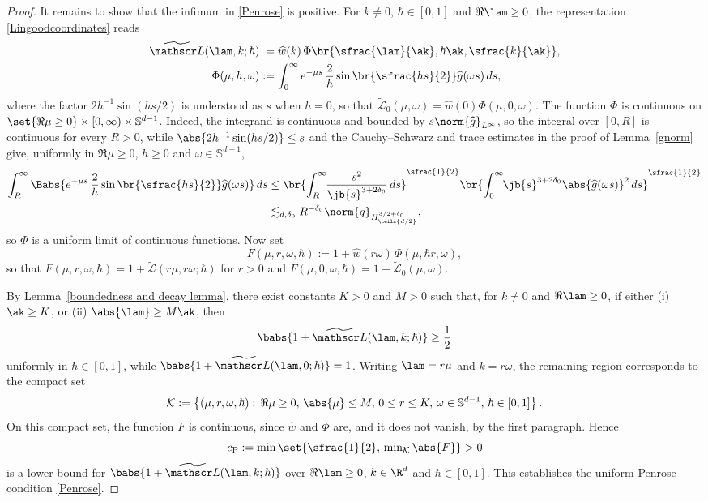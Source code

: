\begin{proof}
It remains to show that the infimum in \eqref{Penrose} is positive. For $k\neq0$, $\hbar\in[0,1]$ and $\Re\lam\geq0$, the representation \eqref{Lingoodcoordinates} reads\vspace*{-3pt}
\begin{align*}
\widetilde{\mathscr L}(\lam,k;\hbar)&\hphantom{:}=\widehat w(k)\,\Phi\br{\sfrac{\lam}{\ak},\hbar\ak,\sfrac{k}{\ak}},\\
\Phi(\mu,h,\omega)&:=\int_0^\infty e^{-\mu s}\,\frac{2}{h}\sin\br{\sfrac{hs}{2}}\widehat g(\omega s)\,ds,
\end{align*}
where the factor $2h^{-1}\sin(hs/2)$ is understood as $s$ when $h=0$, so that $\widetilde{\mathscr L}_0(\mu,\omega)=\widehat w(0)\Phi(\mu,0,\omega)$. The function $\Phi$ is continuous on $\set{\Re\mu\geq0}\times[0,\infty)\times\mathbb S^{d-1}$. Indeed, the integrand is continuous and bounded by $s\norm{\widehat g}_{L^\infty}$, so the integral over $[0,R]$ is continuous for every $R>0$, while $\abs{2h^{-1}\sin(hs/2)}\leq s$ and the Cauchy--Schwarz and trace estimates in the proof of Lemma~\ref{gnorm} give, uniformly in $\Re\mu\geq0$, $h\geq0$ and $\omega\in\mathbb S^{d-1}$,\vspace*{-3pt}
\begin{align*}
\int_R^\infty\Babs{e^{-\mu s}\,\frac{2}{h}\sin\br{\sfrac{hs}{2}}\widehat g(\omega s)}\,ds
&\leq\br{\int_R^\infty\hspace*{-1mm}\frac{s^2}{\jb{s}^{3+2\delta_0}}\,ds}^{\sfrac{1}{2}}\br{\int_0^\infty\hspace*{-1mm}\jb{s}^{3+2\delta_0}\abs{\widehat g(\omega s)}^2\,ds}^{\sfrac{1}{2}}\\
&\lesssim_{d,\delta_0} R^{-\delta_0}\norm{g}_{H^{3/2+\delta_0}_{\ceils{d/2}}},
\end{align*}
so $\Phi$ is a uniform limit of continuous functions. Now set\vspace*{-3pt}
\[
F(\mu,r,\omega,\hbar):=1+\widehat w(r\omega)\,\Phi(\mu,\hbar r,\omega),
\]
so that $F(\mu,r,\omega,\hbar)=1+\widetilde{\mathscr L}(r\mu,r\omega;\hbar)$ for $r>0$ and $F(\mu,0,\omega,\hbar)=1+\widetilde{\mathscr L}_0(\mu,\omega)$.

By Lemma~\ref{boundedness and decay lemma}, there exist constants \( K > 0 \) and \( M > 0 \) such that, for \( k\neq0 \) and \( \Re \lam \geq 0 \), if either (i) \( \ak \geq K \), or (ii) \( \abs{\lam} \geq M\ak \), then
\[
\babs{1 + \widetilde{\mathscr L}(\lam,k;\hbar)} \geq \frac{1}{2}
\]uniformly in $\hbar\in[0,1]$, while $\babs{1 + \widetilde{\mathscr L}(\lam,0;\hbar)}=1$. Writing $\lam=r\mu$ and $k=r\omega$, the remaining region corresponds to the compact set \[
\mathcal K:=\left\{
(\mu, r, \omega, \hbar) : \,
\Re\mu\geq0,\,\abs{\mu} \leq M,\,
0\leq r \leq K,\,
\omega\in\mathbb S^{d-1},\,
\hbar \in [0,1]
\right\}.
\]
On this compact set, the function $F$ is continuous, since $\widehat w$ and $\Phi$ are, and it does not vanish, by the first paragraph. Hence
\[\textstyle
{c_{\mathrm{P}}} := \min\set{\sfrac{1}{2},\,\min_{\mathcal K}\abs{F}} > 0
\]
is a lower bound for $\babs{1 + \widetilde{\mathscr L}(\lam,k;\hbar)}$ over $\Re \lam \geq 0$, $k\in\R^d$ and $\hbar \in [0,1]$.
This establishes the uniform Penrose condition \eqref{Penrose}.
\end{proof}

